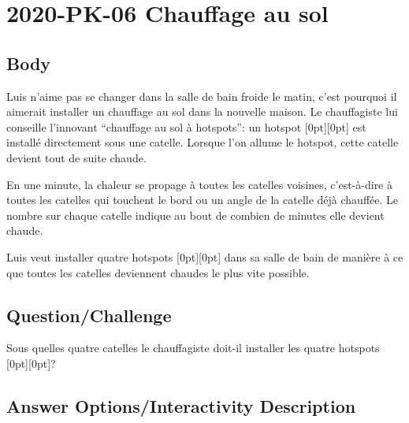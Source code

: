 \documentclass[a4paper,11pt]{report}
\newcommand{\taskGraphicsFolder}{..}
\begin{document}
\section*{\centering{} 2020-PK-06 Chauffage au sol}


\subsection*{Body}

Luis n’aime pas se changer dans la salle de bain froide le matin, c’est pourquoi il aimerait installer un chauffage au sol dans la nouvelle maison. Le chauffagiste lui conseille l’innovant “chauffage au sol à hotspots”: un hotspot \raisebox{-0.5ex}[0pt][0pt]{} est installé directement sous une catelle. Lorsque l’on allume le hotspot, cette catelle devient tout de suite chaude.

{\centering%
\par}

En une minute, la chaleur se propage à toutes les catelles voisines, c’est-à-dire à toutes les catelles qui touchent le bord ou un angle de la catelle déjà chauffée. Le nombre sur chaque catelle indique au bout de combien de minutes elle devient chaude.

Luis veut installer quatre hotspots \raisebox{-0.5ex}[0pt][0pt]{} dans sa salle de bain de manière à ce que toutes les catelles deviennent chaudes le plus vite possible.

{\em

\subsection*{Question/Challenge}

Sous quelles quatre catelles le chauffagiste doit-il installer les quatre hotspots \raisebox{-0.5ex}[0pt][0pt]{}?

{\centering%
\par}

}\begingroup
\renewcommand{\arraystretch}{1.5}
\subsection*{Answer Options/Interactivity Description}
\end{document}
